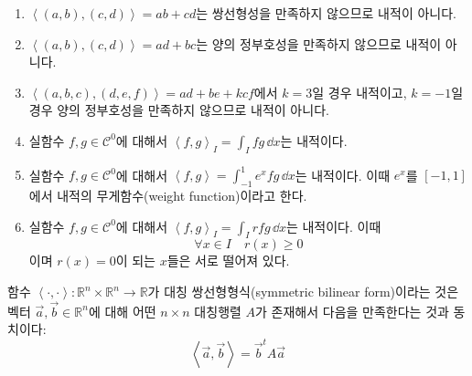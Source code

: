 \documentclass[sections/engineering_mathematics_lecture_note.tex]{subfiles}
\begin{document}
\begin{example}
    \leavevmode
    \begin{enumerate}
        \item $\left< (a, b), (c, d) \right> = ab + cd$는 쌍선형성을 만족하지 않으므로 내적이 아니다.
        \item $\left< (a, b), (c, d) \right> = ad + bc$는 양의 정부호성을 만족하지 않으므로 내적이 아니다.
        \item $\left< (a, b, c), (d, e, f) \right> = ad + be + kcf$에서 $k = 3$일 경우 내적이고, $k = -1$일 경우 양의 정부호성을 만족하지 않으므로 내적이 아니다.
        \item 실함수 $f, g \in \mathcal C^0$에 대해서 $\left<f, g\right>_I = \int_I f g\,\dd x$는 내적이다.
        \item 실함수 $f, g \in \mathcal C^0$에 대해서 $\left<f, g\right> = \int_{-1}^1 e^x f g\,\dd x$는 내적이다. 이때 $e^x$를 $[-1, 1]$에서 내적의 무게함수(weight function)이라고 한다.
        \item 실함수 $f, g \in \mathcal C^0$에 대해서 $\left<f, g\right>_I = \int_I r f g\,\dd x$는 내적이다. 이때
            \begin{equation*}
                \forall x \in I\quad r(x) \geq 0
            \end{equation*}
            이며 $r(x) = 0$이 되는 $x$들은 서로 떨어져 있다.
    \end{enumerate}
\end{example}

\begin{theorem} \label{thm:sym_bilinear}
    함수 $\left<\cdot, \cdot\right>: \mathbb R^n \times \mathbb R^n \rightarrow \mathbb R$가 대칭 쌍선형형식(symmetric bilinear form)이라는 것은 벡터 $\vec a, \vec b \in \mathbb R^n$에 대해 어떤 $n \times n$ 대칭행렬 $A$가 존재해서 다음을 만족한다는 것과 동치이다:
    \begin{equation*}
        \left<\vec a, \vec b\right> = \vec b^t A \vec a
    \end{equation*}
\end{theorem}
\end{document}
